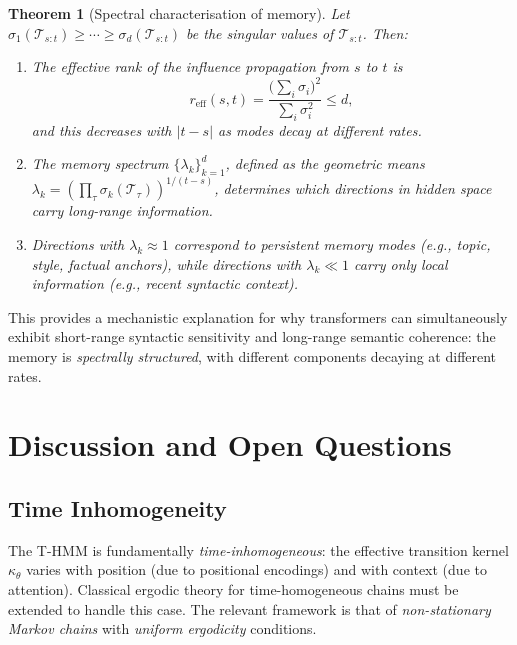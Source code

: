\documentclass[11pt,a4paper]{article}
\theoremstyle{plain}
\newtheorem{theorem}{Theorem}[section]
\theoremstyle{definition}
\theoremstyle{remark}
\newcommand{\cT}{\mathcal{T}}
\begin{document}
\begin{theorem}[Spectral characterisation of memory]\label{thm:spectral}
Let $\sigma_1(\cT_{s:t}) \geq \cdots \geq \sigma_d(\cT_{s:t})$ be the singular
values of $\cT_{s:t}$. Then:
\begin{enumerate}[label=(\roman*)]
  \item The \emph{effective rank} of the influence propagation from $s$ to $t$ is
  \[
    r_{\mathrm{eff}}(s,t)
    = \frac{\bigl(\sum_i \sigma_i\bigr)^2}{\sum_i \sigma_i^2}
    \leq d,
  \]
  and this decreases with $|t-s|$ as modes decay at different rates.

  \item The \emph{memory spectrum} $\{\lambda_k\}_{k=1}^d$, defined as the
  geometric means $\lambda_k = (\prod_\tau \sigma_k(\cT_\tau))^{1/(t-s)}$,
  determines which directions in hidden space carry long-range information.

  \item Directions with $\lambda_k \approx 1$ correspond to
  \emph{persistent memory modes} (e.g., topic, style, factual anchors),
  while directions with $\lambda_k \ll 1$ carry only local information
  (e.g., recent syntactic context).
\end{enumerate}
\end{theorem}

This provides a mechanistic explanation for why transformers can simultaneously
exhibit short-range syntactic sensitivity and long-range semantic coherence: the
memory is \emph{spectrally structured}, with different components decaying at
different rates.


\section{Discussion and Open Questions}\label{sec:discussion}

\subsection{Time Inhomogeneity}

The T-HMM is fundamentally \emph{time-inhomogeneous}: the effective transition
kernel $\kappa_\theta$ varies with position (due to positional encodings) and
with context (due to attention). Classical ergodic theory for time-homogeneous
chains must be extended to handle this case. The relevant framework is that of
\emph{non-stationary Markov chains} with \emph{uniform ergodicity} conditions.
\end{document}
